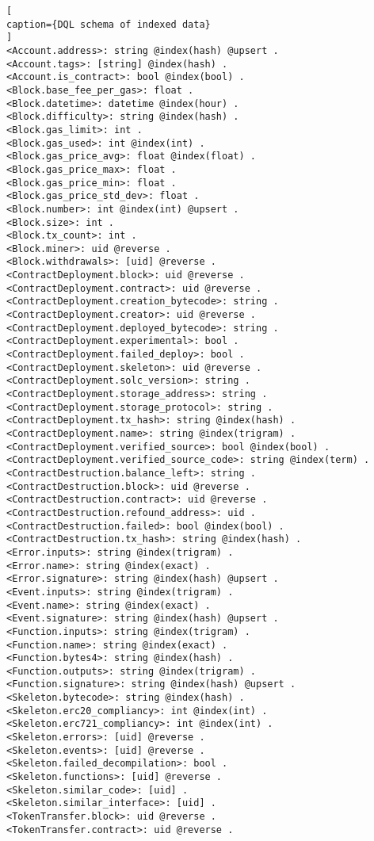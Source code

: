 \begin{lstlisting}[
caption={DQL schema of indexed data}
]
<Account.address>: string @index(hash) @upsert .
<Account.tags>: [string] @index(hash) .
<Account.is_contract>: bool @index(bool) .
<Block.base_fee_per_gas>: float .
<Block.datetime>: datetime @index(hour) .
<Block.difficulty>: string @index(hash) .
<Block.gas_limit>: int .
<Block.gas_used>: int @index(int) .
<Block.gas_price_avg>: float @index(float) .
<Block.gas_price_max>: float .
<Block.gas_price_min>: float .
<Block.gas_price_std_dev>: float .
<Block.number>: int @index(int) @upsert .
<Block.size>: int .
<Block.tx_count>: int .
<Block.miner>: uid @reverse .
<Block.withdrawals>: [uid] @reverse .
<ContractDeployment.block>: uid @reverse .
<ContractDeployment.contract>: uid @reverse .
<ContractDeployment.creation_bytecode>: string .
<ContractDeployment.creator>: uid @reverse .
<ContractDeployment.deployed_bytecode>: string .
<ContractDeployment.experimental>: bool .
<ContractDeployment.failed_deploy>: bool .
<ContractDeployment.skeleton>: uid @reverse .
<ContractDeployment.solc_version>: string .
<ContractDeployment.storage_address>: string .
<ContractDeployment.storage_protocol>: string .
<ContractDeployment.tx_hash>: string @index(hash) .
<ContractDeployment.name>: string @index(trigram) .
<ContractDeployment.verified_source>: bool @index(bool) .
<ContractDeployment.verified_source_code>: string @index(term) .
<ContractDestruction.balance_left>: string .
<ContractDestruction.block>: uid @reverse .
<ContractDestruction.contract>: uid @reverse .
<ContractDestruction.refound_address>: uid .
<ContractDestruction.failed>: bool @index(bool) .
<ContractDestruction.tx_hash>: string @index(hash) .
<Error.inputs>: string @index(trigram) .
<Error.name>: string @index(exact) .
<Error.signature>: string @index(hash) @upsert .
<Event.inputs>: string @index(trigram) .
<Event.name>: string @index(exact) .
<Event.signature>: string @index(hash) @upsert .
<Function.inputs>: string @index(trigram) .
<Function.name>: string @index(exact) .
<Function.bytes4>: string @index(hash) .
<Function.outputs>: string @index(trigram) .
<Function.signature>: string @index(hash) @upsert .
<Skeleton.bytecode>: string @index(hash) .
<Skeleton.erc20_compliancy>: int @index(int) .
<Skeleton.erc721_compliancy>: int @index(int) .
<Skeleton.errors>: [uid] @reverse .
<Skeleton.events>: [uid] @reverse .
<Skeleton.failed_decompilation>: bool .
<Skeleton.functions>: [uid] @reverse .
<Skeleton.similar_code>: [uid] .
<Skeleton.similar_interface>: [uid] .
<TokenTransfer.block>: uid @reverse .
<TokenTransfer.contract>: uid @reverse .

\end{lstlisting}
